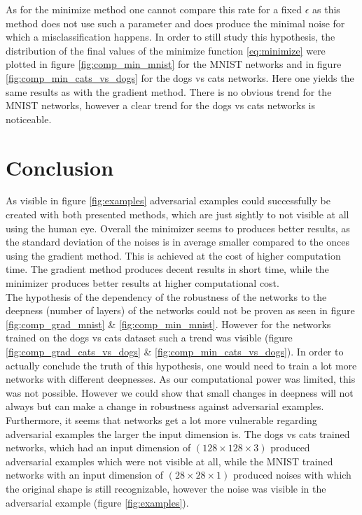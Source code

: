 \documentclass[%
 reprint,
 amsmath,amssymb,
 aps,
]{revtex4-1}
\begin{document}
As for the minimize method one cannot compare this rate for a fixed $\epsilon$ as this method does not use such a parameter and does produce the minimal noise for which a misclassification happens. In order to still study this hypothesis, the distribution of the final values of the minimize function \eqref{eq:minimize} were plotted in figure \ref{fig:comp_min_mnist} for the MNIST networks and in figure \ref{fig:comp_min_cats_vs_dogs} for the dogs vs cats networks. Here one yields the same results as with the gradient method. There is no obvious trend for the MNIST networks, however a clear trend for the dogs vs cats networks is noticeable.\\

\section{Conclusion}

As visible in figure \ref{fig:examples} adversarial examples could successfully be created with both presented methods, which are just sightly to not visible at all using the human eye. Overall the minimizer seems to produces better results, as the standard deviation of the noises is in average smaller compared to the onces using the gradient method. This is achieved at the cost of higher computation time. The gradient method produces decent results in short time, while the minimizer produces better results at higher computational cost. \\
The hypothesis of the dependency of the robustness of the networks to the deepness (number of layers) of the networks could not be proven as seen in figure \ref{fig:comp_grad_mnist} \& \ref{fig:comp_min_mnist}. However for the networks trained on the dogs vs cats dataset such a trend was visible (figure \ref{fig:comp_grad_cats_vs_dogs} \& \ref{fig:comp_min_cats_vs_dogs}). In order to actually conclude the truth of this hypothesis, one would need to train a lot more networks with different deepnesses. As our computational power was limited, this was not possible. However we could show that small changes in deepness will not always but can make a change in robustness against adversarial examples.\\
Furthermore, it seems that networks get a lot more vulnerable regarding adversarial examples the larger the input dimension is. The dogs vs cats trained networks, which had an input dimension of $(128 \times 128 \times 3)$ produced adversarial examples which were not visible at all, while the MNIST trained networks with an input dimension of $(28 \times 28 \times 1)$ produced noises with which the original shape is still recognizable, however the noise was visible in the adversarial example (figure \ref{fig:examples}).\\
\end{document}
